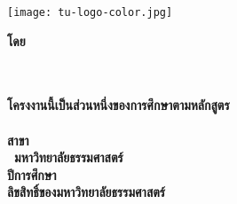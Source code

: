 
\pagestyle{empty}
\begin{center}
	\vspace*{6mm}
	\begin{center}
		\texttt{[image: tu-logo-color.jpg]}\\
	\end{center}
	\vspace{1cm}

	\begin{spacing}{1.4}
		\textbf{\huge\titleThai}
	\end{spacing}
	\vspace*{35mm}
	\textbf{โดย}\\
	\vspace*{10mm}
	\textbf{\authorAThaiNew}\\
	\textbf{\authorBThaiNew}\\
	\vfill

	\begin{spacing}{1.3}
		\textbf{โครงงานนี้เป็นส่วนหนึ่งของการศึกษาตามหลักสูตร\\
			\degreeThai\\
			สาขา\majorThai\\
			\facultyThai\ มหาวิทยาลัยธรรมศาสตร์\\
			ปีการศึกษา \academicYearThai\\
			ลิขสิทธิ์ของมหาวิทยาลัยธรรมศาสตร์}
	\end{spacing}
\end{center}
